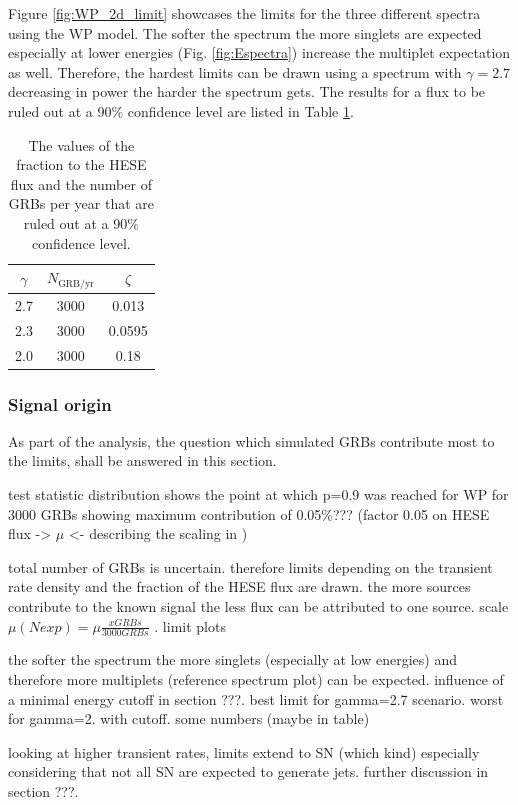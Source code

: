 Figure \ref{fig:WP_2d_limit} showcases the limits for the three different 
spectra using the WP model. The softer the spectrum the more singlets are 
expected especially at lower energies (Fig. \ref{fig:Espectra}) increase the 
multiplet expectation as well. Therefore, the hardest limits can be 
drawn using a spectrum with $\gamma=2.7$ decreasing in power the harder the 
spectrum gets. The results for a flux to be ruled out at a 90\% confidence 
level are listed in Table \ref{tab:WP_2d_limit_3000}.


\begin{table}[h]
  \centering
  \begin{tabular}{c|c|c}
$\gamma$  &  $N_\mathrm{GRB/yr}$ & $\zeta$ \\
\hline
2.7 & 3000 & 0.013 \\
2.3 & 3000 & 0.0595 \\
2.0 & 3000 & 0.18 \\
  \end{tabular}
  \caption{The values of the fraction to the HESE flux and the number of GRBs 
per year that are ruled out at a 90\% confidence level.}
  \label{tab:WP_2d_limit_3000}
\end{table}


\subsubsection{Signal origin}
As part of the analysis, the question which simulated GRBs contribute most to 
the limits, shall be answered in this section.



test statistic distribution shows the point at which p=0.9 was reached for WP 
for 3000 GRBs showing maximum contribution of 0.05\%??? (factor 0.05 on HESE 
flux -> $\mu$ <- describing the scaling in )

total number of GRBs is uncertain. therefore limits depending on the transient 
rate density and the fraction of the HESE flux are drawn. the more sources 
contribute to the known signal the less flux can be attributed to one source. 
scale $\mu (Nexp) = \mu \frac{x GRBs}{3000 GRBs}$ . limit plots

the softer the spectrum the more singlets (especially at low energies) and 
therefore more multiplets (reference spectrum plot) can be expected. 
influence of a minimal energy cutoff in section ???. best limit for gamma=2.7 
scenario. worst for gamma=2. with cutoff. some numbers (maybe in table)

looking at higher transient rates, limits extend to SN (which kind) especially 
considering that not all SN are expected to generate jets. further discussion 
in section ???.

